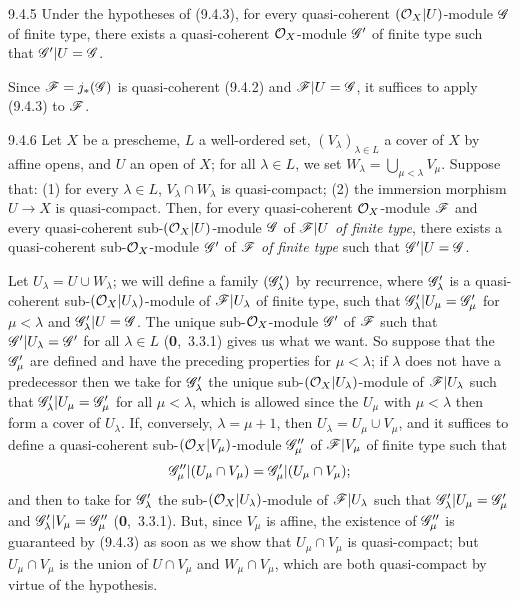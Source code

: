 \documentclass[../main.tex]{subfiles}
\begin{document}
\begin{cx}[Corollary]{9.4.5}
    Under the hypotheses of (9.4.3), for every quasi-coherent $(\mathcal{O}_X|U)$-module $\mathscr{G}$ of finite type, there exists a quasi-coherent $\mathcal{O}_X$-module $\mathscr{G}'$ of finite type such that $\mathscr{G}'|U=\mathscr{G}$.
\end{cx}

Since $\mathscr{F}=j_*(\mathscr{G})$ is quasi-coherent (9.4.2) and $\mathscr{F}|U=\mathscr{G}$, it suffices to apply (9.4.3) to $\mathscr{F}$.

\begin{cx}[Lemma]{9.4.6}
    Let $X$ be a prescheme, $L$ a well-ordered set, $(V_\lambda)_{\lambda\in L}$ a cover of $X$ by affine opens, and $U$ an open of $X$; for all $\lambda\in L$, we set $W_\lambda=\bigcup_{\mu<\lambda}V_\mu$.
    Suppose that: (1) for every $\lambda\in L$, $V_\lambda\cap W_\lambda$ is quasi-compact; (2) the immersion morphism $U\to X$ is quasi-compact.
    Then, for every quasi-coherent $\mathcal{O}_X$-module $\mathscr{F}$ and every quasi-coherent sub-$(\mathcal{O}_X|U)$-module $\mathscr{G}$ of $\mathscr{F}|U$ \emph{of finite type}, there exists a quasi-coherent sub-$\mathcal{O}_X$-module $\mathscr{G}'$ of $\mathscr{F}$ \emph{of finite type} such that $\mathscr{G}'|U=\mathscr{G}$.
\end{cx}

Let $U_\lambda=U\cup W_\lambda$; we will define a family $(\mathscr{G}'_\lambda)$ by recurrence, where $\mathscr{G}'_\lambda$ is a quasi-coherent sub-$(\mathcal{O}_X|U_\lambda)$-module of $\mathscr{F}|U_\lambda$ of finite type, such that $\mathscr{G}'_\lambda|U_\mu=\mathscr{G}'_\mu$ for $\mu<\lambda$ and $\mathscr{G}'_\lambda|U=\mathscr{G}$.
The unique sub-$\mathcal{O}_X$-module $\mathscr{G}'$ of $\mathscr{F}$ such that $\mathscr{G}'|U_\lambda=\mathscr{G}'$ for all $\lambda\in L$ (\textbf{0},~3.3.1) gives us what we want.
So suppose that the $\mathscr{G}'_\mu$ are defined and have the preceding properties for $\mu<\lambda$; if $\lambda$ does not have a predecessor then we take for $\mathscr{G}'_\lambda$ the unique sub-$(\mathcal{O}_X|U_\lambda)$-module of $\mathscr{F}|U_\lambda$ such that $\mathscr{G}'_\lambda|U_\mu=\mathscr{G}'_\mu$ for all $\mu<\lambda$, which is allowed since the $U_\mu$ with $\mu<\lambda$ then form a cover of $U_\lambda$.
If, conversely, $\lambda=\mu+1$, then $U_\lambda=U_\mu\cup V_\mu$, and it suffices to define a quasi-coherent sub-$(\mathcal{O}_X|V_\mu)$-module $\mathscr{G}''_\mu$ of $\mathscr{F}|V_\mu$ of finite type such that
\begin{equation*}
    \mathscr{G}''_\mu|(U_\mu\cap V_\mu)=\mathscr{G}'_\mu|(U_\mu\cap V_\mu);
\end{equation*}
and then to take for $\mathscr{G}'_\lambda$ the sub-$(\mathcal{O}_X|U_\lambda)$-module of $\mathscr{F}|U_\lambda$ such that $\mathscr{G}'_\lambda|U_\mu=\mathscr{G}'_\mu$ and $\mathscr{G}'_\lambda|V_\mu=\mathscr{G}''_\mu$ (\textbf{0},~3.3.1).
But, since $V_\mu$ is affine, the existence of $\mathscr{G}''_\mu$ is guaranteed by (9.4.3) as soon as we show that $U_\mu\cap V_\mu$ is quasi-compact; but $U_\mu\cap V_\mu$ is the union of $U\cap V_\mu$ and $W_\mu\cap V_\mu$, which are both quasi-compact by virtue of the hypothesis.
\end{document}
